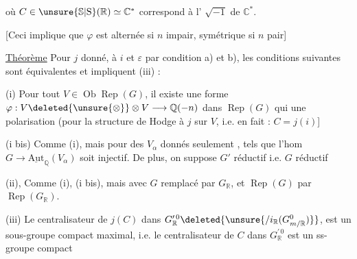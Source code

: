 où $C\in\unsure{\mathbb{S}|\mathrm{S}}(\mathbb{R})\simeq\mathbb{C}^{*}$ correspond à l' $\sqrt{-1}$ de $\mathbb{C}^{*}$.

[Ceci implique que $\varphi$ est alternée si $n$ impair, symétrique si $n$ pair]

\uline{Théorème} Pour $j$ donné,  à $i$ et $\varepsilon$ par condition a) et b), les conditions suivantes  sont équivalentes et impliquent (iii) :

(i) Pour tout $V\in\operatorname{Ob}\operatorname{Rep}(G)$,  il existe une forme $\varphi:V\deleted{\unsure{\otimes}}\otimes V\longrightarrow\mathbb{Q}(-n)$ dans $\operatorname{Rep}(G)$ qui  une polarisation (pour la structure de Hodge  à $j$ sur $V$, \unsure{$j$|$]$|$\}$} i.e. en fait : $C=j(i)$]

(i bis) Comme (i), mais  pour des $V_{\alpha}$ donnés seulement ,  tels que  l'hom $G\longrightarrow\underline{\mathrm{Aut}}_{\mathbb{Q}}(V_{\alpha})$ soit injectif. De plus, on suppose $G'$ réductif i.e. $G$ réductif

(ii),  Comme (i), (i bis), mais avec $G$ remplacé par $G_{\mathbb{R}}$, et $\operatorname{Rep}(G)$ par $\operatorname{Rep}(G_{\mathbb{R}})$.

(iii)  Le centralisateur de $j(C)$  dans $G_{\mathbb{R}}^{\prime\,0}\deleted{\unsure{/i_{\mathbb{R}}(G_{m/\mathbb{R}}^{0})}}$,  est un sous-groupe compact maximal,  i.e. le centralisateur de $C$ dans $G_{\mathbb{R}}^{\prime\,0}$ est un ss-groupe compact 

